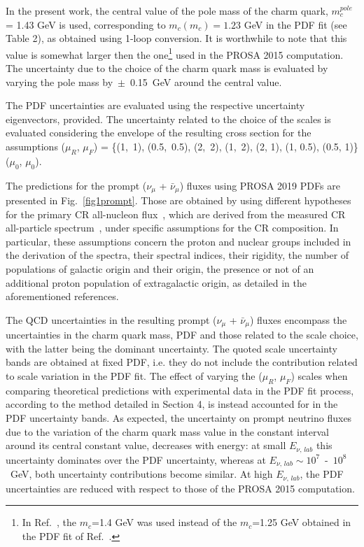 \documentclass[12pt]{article}
\begin{document}
In the present work, the central value of the pole mass of the charm quark, $m_c^{pole}$ = 1.43 GeV is used, corresponding to $m_c(m_c) = 1.23$ GeV in the PDF fit (see Table 2), as obtained using 1\nobreakdash-loop conversion. It is worthwhile to note that this value is somewhat larger then the one\footnote{In Ref.~\cite{Garzelli:2016xmx}, the $m_c$=1.4 GeV was used instead of the $m_c$=1.25 GeV obtained in the PDF fit of Ref.~\cite{Zenaiev:2015rfa}.} used in the PROSA 2015 computation.  
The uncertainty due to the choice of the charm quark mass is evaluated by varying the pole mass by~$\pm$~0.15~GeV around the central value.

The PDF uncertainties are evaluated using the respective uncertainty eigenvectors, provided. 
The uncertainty related to the choice of the scales is evaluated considering the envelope of the resulting cross section for the assumptions ($\mu_R$, $\mu_F$) = \{(1,~1), (0.5,~0.5), (2,~2), (1,~2), (2, 1), (1, 0.5), (0.5, 1)\} ($\mu_0$, $\mu_0$). 
  
The predictions for the prompt ($\nu_\mu$ + $\bar{\nu}_\mu$) fluxes using PROSA 2019 PDFs are presented in Fig.~\ref{fig1prompt}. Those are obtained by using different hypotheses for the primary CR all-nucleon flux~\cite{Gaisser:2011cc,Gaisser:2013bla}, which are derived from the measured CR all-particle spectrum~\cite{Kachelriess:2019oqu}, under specific assumptions for the CR composition. In particular, these assumptions concern the proton and nuclear groups included in the derivation of the spectra, their spectral indices, their rigidity, the number of populations of galactic origin and their origin, the presence or not of an additional proton population of extragalactic origin, as detailed in the aforementioned references.   

The QCD uncertainties in the resulting prompt ($\nu_\mu$ + $\bar{\nu}_\mu$) fluxes encompass the uncertainties in the charm quark mass, PDF and those related to the scale choice, with the latter being the dominant uncertainty. The quoted scale uncertainty bands are obtained at fixed PDF, i.e. they do not include the contribution related to scale variation in the PDF fit. The effect of varying the ($\mu_R$, $\mu_F$) scales when comparing theoretical predictions with experimental data in the PDF fit process, according to the method detailed in Section 4, is instead accounted for in the PDF uncertainty bands.  
As expected, the uncertainty on prompt neutrino fluxes due to the variation of the charm quark mass value in the constant interval around its central constant value, decreases with energy: at small $E_{\nu,\,lab}$ this uncertainty dominates over the PDF uncertainty, whereas at $E_{\nu,\,lab} \sim 10^7$~-~$10^8$~GeV, both uncertainty contributions become similar. 
At high $E_{\nu,\,lab}$, the PDF uncertainties are reduced with respect to those of the PROSA 2015 computation. 
\end{document}
